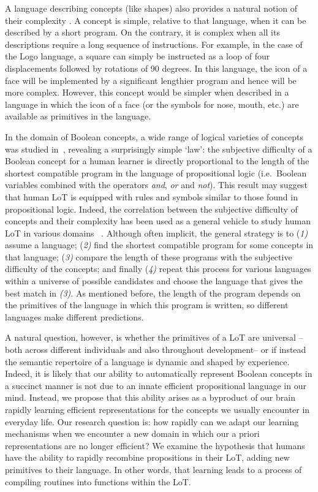 A language describing concepts (like shapes) also provides a natural notion of their complexity \cite{kolmogorov1968three}. A concept is simple, relative to that language, when it can be described by a short program. On the contrary, it is complex when all its descriptions require a long sequence of instructions. For example, in the case of the Logo language, a square can simply be instructed as a loop of four displacements followed by rotations of 90 degrees. In this language, the icon of a face will be implemented by a significant lengthier program and hence will be more complex.  However, this concept would be simpler when described in a language in which the icon of a face (or the symbols for nose, mouth, etc.) are available as primitives in the language.

In the domain of Boolean concepts, a wide range of logical varieties of concepts was studied in~\cite{feldman2003simplicity}, revealing a surprisingly simple `law': the subjective difficulty of a Boolean concept for a human learner is directly proportional to the length of the shortest compatible program in the language of propositional logic (i.e.\ Boolean variables combined with the operators \textit{and}, \textit{or} and \textit{not}). This result may suggest that human LoT is equipped with rules and symbols similar to those found in propositional logic. Indeed, the correlation between the subjective difficulty of concepts and their complexity has been used as a general vehicle to study human LoT in various domains ~\cite{piantadosi2016logical,leeuwenberg1971perceptual,amalric2017language,romano2018,lupyan2007language}. Although often implicit, the general strategy is to (\textit{1)} assume a language; (\textit{2)} find the shortest compatible program for some concepts in that language; (\textit{3)} compare the length of these programs with the subjective difficulty of the concepts; and finally (\textit{4)} repeat this process for various languages within a universe of possible candidates and choose the language that gives the best match in \textit{(3)}. As mentioned before, the length of the program depends on the primitives of the language in which this program is written, so different languages make different predictions.

A natural question, however, is whether the primitives of a LoT are universal --both across different individuals and also throughout development-- or if instead the semantic repertoire of a language is dynamic and shaped by experience. Indeed, it is likely that our ability to automatically represent Boolean concepts in a succinct manner is not due to an innate efficient propositional language in our mind. Instead, we propose that this ability arises as a byproduct of our brain rapidly learning efficient representations for the concepts we usually  encounter in everyday life. Our research question is: how rapidly can we adapt our learning mechanisms when we encounter a new domain in which our a priori representations are no longer efficient? We examine the hypothesis that humans have the ability to rapidly recombine propositions in their LoT, adding new primitives to their language. In other words, that learning leads to a process of compiling routines into functions within the LoT.


